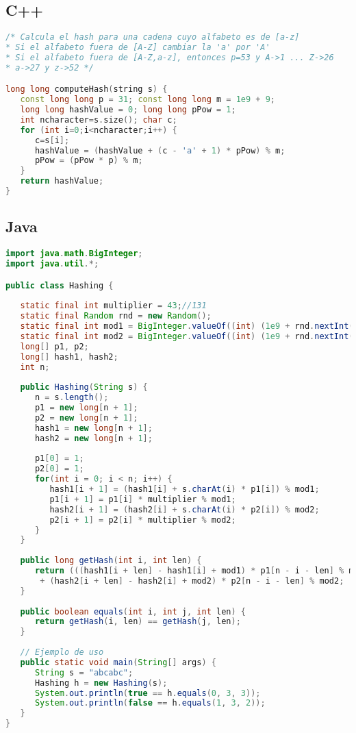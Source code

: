 \subsection{C++}

\begin{lstlisting}[language=C++]
/* Calcula el hash para una cadena cuyo alfabeto es de [a-z]
* Si el alfabeto fuera de [A-Z] cambiar la 'a' por 'A'
* Si el alfabeto fuera de [A-Z,a-z], entonces p=53 y A->1 ... Z->26
* a->27 y z->52 */

long long computeHash(string s) {
   const long long p = 31; const long long m = 1e9 + 9;
   long long hashValue = 0; long long pPow = 1;
   int ncharacter=s.size(); char c;
   for (int i=0;i<ncharacter;i++) {
      c=s[i];  
      hashValue = (hashValue + (c - 'a' + 1) * pPow) % m;
      pPow = (pPow * p) % m;
   }
   return hashValue;
}
\end{lstlisting} 


\subsection{Java}
\begin{lstlisting}[language=Java]
import java.math.BigInteger;
import java.util.*;

public class Hashing {
	
   static final int multiplier = 43;//131
   static final Random rnd = new Random();
   static final int mod1 = BigInteger.valueOf((int) (1e9 + rnd.nextInt((int) 1e9))).nextProbablePrime().intValue();
   static final int mod2 = BigInteger.valueOf((int) (1e9 + rnd.nextInt((int) 1e9))).nextProbablePrime().intValue();
   long[] p1, p2;
   long[] hash1, hash2;
   int n;
	
   public Hashing(String s) {
      n = s.length();
      p1 = new long[n + 1];
      p2 = new long[n + 1];
      hash1 = new long[n + 1];
      hash2 = new long[n + 1];
		
      p1[0] = 1;
      p2[0] = 1;
      for(int i = 0; i < n; i++) {
         hash1[i + 1] = (hash1[i] + s.charAt(i) * p1[i]) % mod1;
         p1[i + 1] = p1[i] * multiplier % mod1;
         hash2[i + 1] = (hash2[i] + s.charAt(i) * p2[i]) % mod2;
         p2[i + 1] = p2[i] * multiplier % mod2;
      }
   }
	
   public long getHash(int i, int len) {
      return (((hash1[i + len] - hash1[i] + mod1) * p1[n - i - len] % mod1) << 32)
       + (hash2[i + len] - hash2[i] + mod2) * p2[n - i - len] % mod2;
   }
	
   public boolean equals(int i, int j, int len) {
      return getHash(i, len) == getHash(j, len);
   }
	
   // Ejemplo de uso
   public static void main(String[] args) {
      String s = "abcabc";
      Hashing h = new Hashing(s);
      System.out.println(true == h.equals(0, 3, 3));
      System.out.println(false == h.equals(1, 3, 2));
   }
}
\end{lstlisting}


